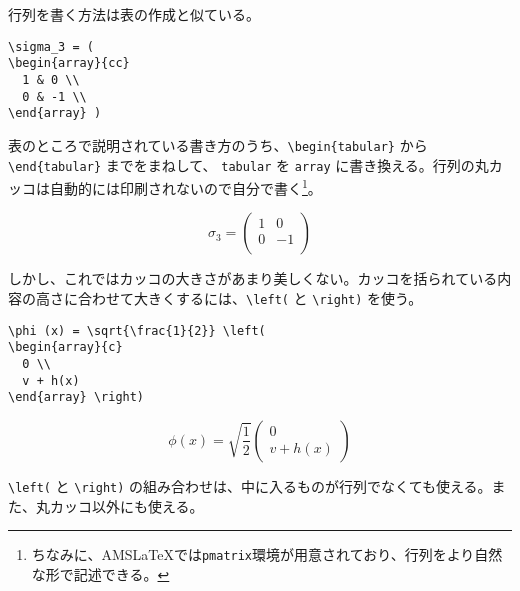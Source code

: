 行列を書く方法は表の作成と似ている。
\begin{reidai}
\begin{verbatim}
\sigma_3 = (
\begin{array}{cc}
  1 & 0 \\
  0 & -1 \\
\end{array} )
\end{verbatim}
\end{reidai} \noindent
表のところで説明されている書き方のうち、\verb|\begin{tabular}| から\verb|\end{tabular}| までをまねして、 \texttt{tabular} を \texttt{array} に書き換える。行列の丸カッコは自動的には印刷されないので自分で書く\footnote{ちなみに、AMS\LaTeX では{\tt pmatrix}環境が用意されており、行列をより自然な形で記述できる。}。
\begin{kekka}
  \begin{equation*}
    \sigma_3 = (
    \begin{array}{cc}
      1 & 0 \\
      0 & -1 \\
    \end{array} )
  \end{equation*}
  \vspace{0pt}
\end{kekka} \noindent
しかし、これではカッコの大きさがあまり美しくない。カッコを括られている内容の高さに合わせて大きくするには、\verb|\left(| と \verb|\right)| を使う。
\begin{reidai}
\begin{verbatim}
\phi (x) = \sqrt{\frac{1}{2}} \left(
\begin{array}{c}
  0 \\
  v + h(x)
\end{array} \right)
\end{verbatim}
\end{reidai} \noindent
\vspace*{-1.5em}
\begin{kekka}
  \begin{equation}
    \phi (x) = \sqrt{\frac{1}{2}} \left(
      \begin{array}{c}
        0 \\
        v + h(x)
      \end{array} \right)
  \end{equation}
  \vspace{0pt}
\end{kekka} \noindent
\verb|\left(| と \verb|\right)| の組み合わせは、中に入るものが行列でなくても使える。また、丸カッコ以外にも使える。
